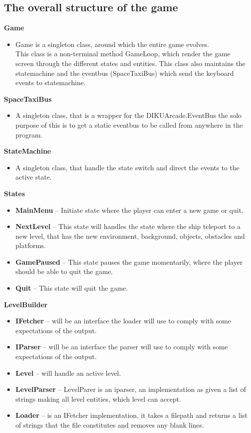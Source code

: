 \documentclass[../master.tex]{subfile}
\begin{document}
\subsection{The overall structure of the game}
\textbf{Game}
\begin{itemize}
	\item[] Game is a singleton class, around which the entire game evolves.\\
	This class is a non-terminal method GameLoop, which render the game screen through the different states and entities. This class also maintains the statemachine and the eventbus (SpaceTaxiBus) which send the keyboard events to statemachine.
\end{itemize}
\textbf{SpaceTaxiBus}
\begin{itemize}
	\item[] A singleton class, that is a wrapper for the DIKUArcade.EventBus the solo purpose of this is to get a static eventbus to be called from anywhere in the program.
\end{itemize}
\textbf{StateMachine}
\begin{itemize}
	\item[] A singleton class, that handle the state switch and direct the events to the active state.
\end{itemize}

\textbf{States}
\begin{itemize}
	\item [] \textbf{MainMenu} -- Initiate state where the player can enter a new game or quit. 
	\item [] \textbf{NextLevel} -- This state will handles the state where the ship teleport to a new level, that has the new environment, background, objects, obstacles and platforms.
	\item [] \textbf{GamePaused} -- This state pauses the game momentarily, where the player should be able to quit the game.
	\item [] \textbf{Quit} -- This state will quit the game.\\
\end{itemize}

\textbf{LevelBuilder}
\begin{itemize}
	\item[] \textbf{IFetcher} -- will be an interface the loader will use to comply with some expectations of the output.
	\item[] \textbf{IParser} -- will be an interface the parser will use to comply with some expectations of the output.
	\item[] \textbf{Level} -- will handle an active level.
	\item[] \textbf{LevelParser} -- LevelParer is an iparser, an implementation as given a list of strings making all level entities, which level can accept.
	\item[] \textbf{Loader} -- is an IFetcher implementation, it takes a filepath and returns a list of strings that the file constitutes and removes any blank lines.\\
\end{itemize}
\end{document}
